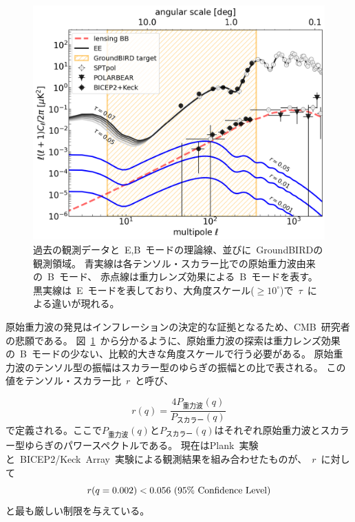 \begin{figure}[htbp]
  \centering
  \includegraphics[width=0.8\columnwidth]{2_cosmology/figs/cl_shonda.pdf}
  \caption{過去の観測データと~E,B~モードの理論線、並びに~GroundBIRDの観測領域\cite{shonda_spie}。
  青実線は各テンソル・スカラー比での原始重力波由来の~B~モード、
  赤点線は重力レンズ効果による~B~モードを表す。
  黒実線は~E~モードを表しており、大角度スケール($\geq 10^{\circ}$)で~$\tau$~による違いが現れる。}
  \label{cl_shonda}
\end{figure}
原始重力波の発見はインフレーションの決定的な証拠となるため、CMB~研究者の悲願である。
図~\ref{cl_shonda}~から分かるように、原始重力波の探索は重力レンズ効果の~B~モードの少ない、比較的大きな角度スケールで行う必要がある。
原始重力波のテンソル型の振幅はスカラー型のゆらぎの振幅との比で表される。
この値をテンソル・スカラー比~$r$~と呼び、

\begin{equation}
  r(q) = \frac{4P_{重力波}(q)}{P_{スカラー}(q)}
  \label{tenserscalar}
\end{equation}
で定義される。ここで$P_{重力波}(q)とP_{スカラー}(q)$はそれぞれ原始重力波とスカラー型ゆらぎのパワースペクトルである。
現在はPlank~実験と~BICEP2/Keck~Array~実験による観測結果を組み合わせたものが、~$r$~に対して
\begin{equation}
  r(q = 0.002) < 0.056~(95\%~{\rm Confidence~Level})
\end{equation}
と最も厳しい制限を与えている\cite{plank}。


